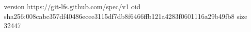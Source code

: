 version https://git-lfs.github.com/spec/v1
oid sha256:008cabc357df40486ecee3115df7db8f6466ffb121a4283f0601116a29b49fb8
size 32447
